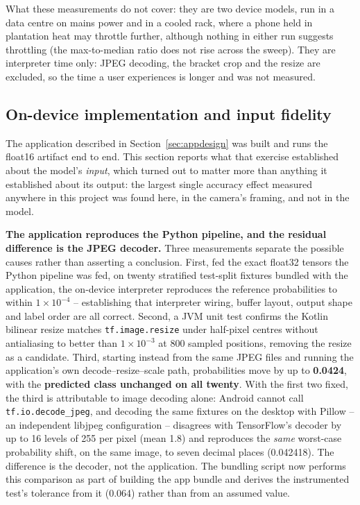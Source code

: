 \documentclass{article}
\begin{document}
What these measurements do not cover: they are two device models, run in a data centre on mains power and
in a cooled rack, where a phone held in plantation heat may throttle further, although nothing in either run
suggests throttling (the max-to-median ratio does not rise across the sweep). They are interpreter time
only: JPEG decoding, the bracket crop and the resize are excluded, so the time a user experiences is longer
and was not measured.

\subsection{On-device implementation and input fidelity}
\label{sec:ondevice}

The application described in Section~\ref{sec:appdesign} was built and runs the float16 artifact end to
end. This section reports what that exercise established about the model's \textit{input}, which turned
out to matter more than anything it established about its output: the largest single accuracy effect
measured anywhere in this project was found here, in the camera's framing, and not in the model.

\textbf{The application reproduces the Python pipeline, and the residual difference is the JPEG decoder.}
Three measurements separate the possible causes rather than asserting a conclusion. First, fed the exact
float32 tensors the Python pipeline was fed, on twenty stratified test-split fixtures bundled with the
application, the on-device interpreter reproduces the reference probabilities to within
\textbf{$1\times10^{-4}$} -- establishing that interpreter wiring, buffer layout, output shape and label
order are all correct. Second, a JVM unit test confirms the Kotlin bilinear resize matches
\texttt{tf.image.resize} under half-pixel centres without antialiasing to better than $1\times10^{-3}$ at
800 sampled positions, removing the resize as a candidate. Third, starting instead from the same JPEG
files and running the application's own decode--resize--scale path, probabilities move by up to
\textbf{0.0424}, with the \textbf{predicted class unchanged on all twenty}. With the first two fixed, the
third is attributable to image decoding alone: Android cannot call \texttt{tf.io.decode\_jpeg}, and
decoding the same fixtures on the desktop with Pillow -- an independent libjpeg configuration --
disagrees with TensorFlow's decoder by up to 16 levels of 255 per pixel (mean 1.8) and reproduces the
\textit{same} worst-case probability shift, on the same image, to seven decimal places (0.042418). The
difference is the decoder, not the application. The bundling script now performs this comparison as part
of building the app bundle and derives the instrumented test's tolerance from it (0.064) rather than from
an assumed value.
\end{document}
